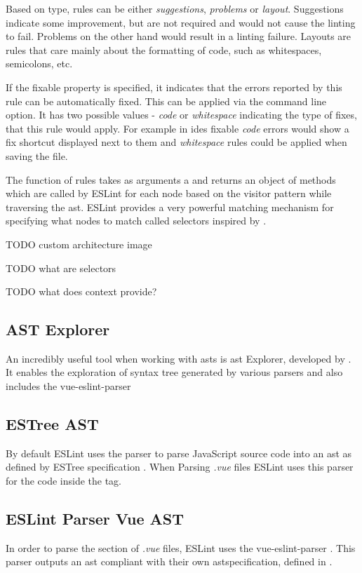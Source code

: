 Based on type, rules can be either \textit{suggestions}, \textit{problems} or \textit{layout}. Suggestions indicate some improvement, but are not required and would not cause the linting to fail. Problems on the other hand would result in a linting failure. Layouts are rules that care mainly about the formatting of code, such as whitespaces, semicolons, etc. 

If the fixable property is specified, it indicates that the errors reported by this rule can be automatically fixed. This can be applied via the  command line option. It has two possible values - \textit{code} or \textit{whitespace} indicating the type of fixes, that this rule would apply. For example in \glspl{ide} fixable \textit{code} errors would show a fix shortcut displayed next to them and \textit{whitespace} rules could be applied when saving the file.

The  function of rules takes as arguments a  and returns an object of methods which are called by ESLint for each node based on the \gls{visitor} pattern while traversing the \gls{ast}. ESLint provides a very powerful matching mechanism for specifying what nodes to match called selectors \parencite{eslintSelectors} inspired by \textcite{estoolsEsQuery}. 


TODO custom architecture image

TODO what are selectors

TODO what does context provide?

\subsection{AST Explorer}
An incredibly useful tool when working with \glspl{ast} is \gls{ast} Explorer, developed by \textcite{astexplorer_fkling2021Jan}. It enables the exploration of syntax tree generated by various parsers and also includes the vue-eslint-parser \parencite{eslint_vue_parser}

\subsection{ESTree AST}
By default ESLint uses the \parencite{eslintEspree} parser to parse JavaScript source code into an \gls{ast} as defined by ESTree specification \parencite{estreeASTSpec}. When Parsing \textit{.vue} files ESLint uses this parser for the code inside the  tag.
  
\subsection{ESLint Parser Vue AST}
In order to parse the  section of \textit{.vue} files, ESLint uses the vue-eslint-parser \parencite{eslint_vue_parser}. This parser outputs an  \gls{ast} compliant with their own  \gls{ast}specification, defined in \parencite{eslint_vue_parser_ast}.
